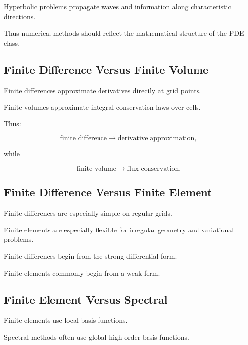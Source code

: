 Hyperbolic problems propagate waves and information along characteristic
directions.

Thus numerical methods should reflect the mathematical structure of the
PDE class.

\subsection{Finite Difference Versus Finite Volume}
\label{subsec:fd-vs-fv}

Finite differences approximate derivatives directly at grid points.

Finite volumes approximate integral conservation laws over cells.

Thus:

\[
\boxed{
\text{finite difference}
\rightarrow
\text{derivative approximation},
}
\]

while

\[
\boxed{
\text{finite volume}
\rightarrow
\text{flux conservation}.
}
\]

\subsection{Finite Difference Versus Finite Element}
\label{subsec:fd-vs-fem}

Finite differences are especially simple on regular grids.

Finite elements are especially flexible for irregular geometry and
variational problems.

Finite differences begin from the strong differential form.

Finite elements commonly begin from a weak form.

\subsection{Finite Element Versus Spectral}
\label{subsec:fem-vs-spectral}

Finite elements use local basis functions.

Spectral methods often use global high-order basis functions.

